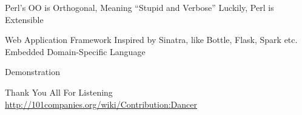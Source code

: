 \nextframe
\begin{frame}
    \begin{itemize}
        \fitem Perl's OO is Orthogonal\pause, Meaning ``Stupid and Verbose''
        \fitem Luckily, Perl is Extensible
    \end{itemize}
\end{frame}

\nextframe
\begin{frame}
    \begin{itemize}
        \fitem Web Application Framework
        \fitem Inspired by Sinatra, like Bottle, Flask, Spark etc.
        \fitem Embedded Domain-Specific Language
    \end{itemize}
\end{frame}

\nextframe
\begin{frame}
    \begin{center}\vspace{75pt}
        {\Huge Demonstration}
    \end{center}
\end{frame}

\nextframe
\begin{frame}
    \begin{center}\vspace{70pt}
        {\Huge Thank You All For Listening}\\
        \vspace{54.35pt}
        \url{http://101companies.org/wiki/Contribution:Dancer}
    \end{center}
\end{frame}


